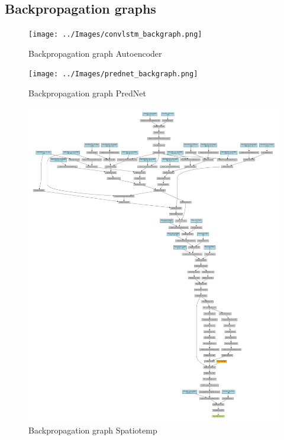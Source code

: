  \subsection*{Backpropagation graphs}
  \begin{figure}[H]
   \texttt{[image: ../Images/convlstm\_backgraph.png]}
   \centering
   \caption{Backpropagation graph Autoencoder}
   \label{fig:backprop_autoenc}
  \end{figure}\noindent
  \begin{figure}[H]
   \texttt{[image: ../Images/prednet\_backgraph.png]}
   \centering
   \caption{Backpropagation graph PredNet}
   \label{fig:backprop_prednet}
  \end{figure}\noindent
  \begin{figure}[H]
   \includegraphics[width=1.0\textwidth]{../Images/spatiotemp_backgraph.png}
   \centering
   \caption{Backpropagation graph Spatiotemp}
   \label{fig:backprop_spatio}
  \end{figure}\noindent

\newpage

